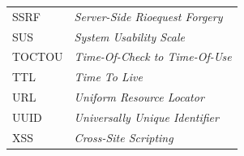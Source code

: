 \documentclass[a4paper,openright,twoside,11pt]{report}
\begin{document}
\begin{center}
\begin{tabular}{ll}
SSRF    & \textit{Server-Side Rioequest Forgery} \\
SUS     & \textit{System Usability Scale} \\
TOCTOU  & \textit{Time-Of-Check to Time-Of-Use} \\
TTL     & \textit{Time To Live} \\
URL     & \textit{Uniform Resource Locator} \\
UUID    & \textit{Universally Unique Identifier} \\
XSS     & \textit{Cross-Site Scripting} \\
\hline
\end{tabular}
\end{center}

\cleardoublepage
\tableofcontents \cleardoublepage


\setcounter{page}{1}













% 






\appendix

\end{document}
